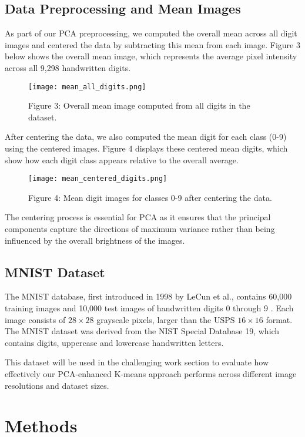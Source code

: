 \documentclass{article}
\begin{document}
\subsection{Data Preprocessing and Mean Images}
As part of our PCA preprocessing, we computed the overall mean across all digit images and centered the data by subtracting this mean from each image. Figure 3 below shows the overall mean image, which represents the average pixel intensity across all 9,298 handwritten digits.
\begin{figure}[H]
  \centering
  \texttt{[image: mean\_all\_digits.png]}
  \caption*{Figure 3: Overall mean image computed from all digits in the dataset.}
\end{figure}
After centering the data, we also computed the mean digit for each class (0-9) using the centered images. Figure 4 displays these centered mean digits, which show how each digit class appears relative to the overall average.
\begin{figure}[H]
  \centering
  \texttt{[image: mean\_centered\_digits.png]}
  \caption*{Figure 4: Mean digit images for classes 0-9 after centering the data.}
\end{figure}
The centering process is essential for PCA as it ensures that the principal components capture the directions of maximum variance rather than being influenced by the overall brightness of the images.
\subsection{MNIST Dataset}
The MNIST database, first introduced in 1998 by LeCun et al., contains 60,000 training images and 10,000 test images of handwritten digits 0 through 9 \cite{cohen2017emnist}. Each image consists of $28 \times 28$ grayscale pixels, larger than the USPS $16 \times 16$ format. The MNIST dataset was derived from the NIST Special Database 19, which contains digits, uppercase and lowercase handwritten letters.

This dataset will be used in the challenging work section to evaluate how effectively our PCA-enhanced K-means approach performs across different image resolutions and dataset sizes.


\section{Methods}
\end{document}
